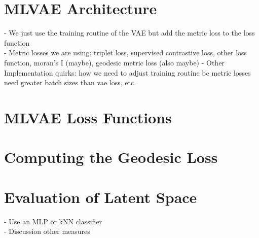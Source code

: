 \documentclass[./dissertation.tex]{subfiles}
\begin{document}
    \section{MLVAE Architecture}
    - We just use the training routine of the VAE but add the metric loss to the loss function \\
    - Metric losses we are using: triplet loss, supervised contrastive loss, other loss function, moran's I (maybe), geodesic metric loss (also maybe)
    - Other Implementation quirks: how we need to adjust training routine bc metric losses need greater batch sizes than vae loss, etc.
    \section{MLVAE Loss Functions}
    \section{Computing the Geodesic Loss}
    \section{Evaluation of Latent Space}
    - Use an MLP or kNN classifier \\
    - Discussion other measures 
    
\end{document}
